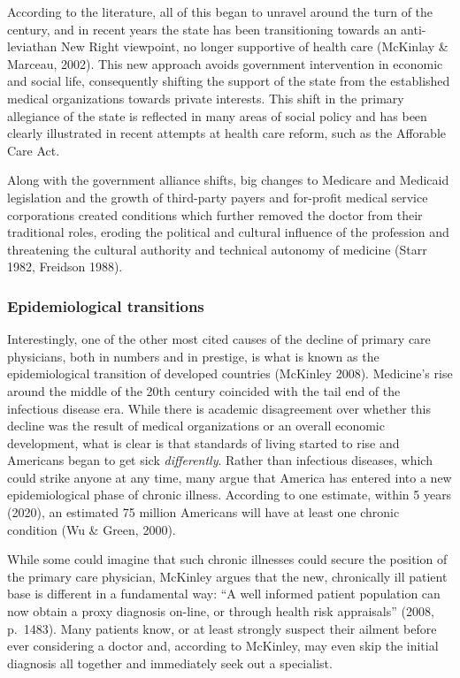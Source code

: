 \documentclass[12pt,twoside]{reedthesis}
\begin{document}
  According to the literature, all of this began to unravel around the
  turn of the century, and in recent years the state has been
  transitioning towards an anti-leviathan New Right viewpoint, no longer
  supportive of health care (McKinlay \& Marceau, 2002). This new approach
  avoids government intervention in economic and social life, consequently
  shifting the support of the state from the established medical
  organizations towards private interests. This shift in the primary
  allegiance of the state is reflected in many areas of social policy and
  has been clearly illustrated in recent attempts at health care reform,
  such as the Afforable Care Act.
  
  Along with the government alliance shifts, big changes to Medicare and
  Medicaid legislation and the growth of third-party payers and for-profit
  medical service corporations created conditions which further removed
  the doctor from their traditional roles, eroding the political and
  cultural influence of the profession and threatening the cultural
  authority and technical autonomy of medicine (Starr 1982, Freidson
  1988).
  
  \subsubsection*{Epidemiological
  transitions}\label{epidemiological-transitions}
  
  Interestingly, one of the other most cited causes of the decline of
  primary care physicians, both in numbers and in prestige, is what is
  known as the epidemiological transition of developed countries (McKinley
  2008). Medicine's rise around the middle of the 20th century coincided
  with the tail end of the infectious disease era. While there is academic
  disagreement over whether this decline was the result of medical
  organizations or an overall economic development, what is clear is that
  standards of living started to rise and Americans began to get sick
  \emph{differently}. Rather than infectious diseases, which could strike
  anyone at any time, many argue that America has entered into a new
  epidemiological phase of chronic illness. According to one estimate,
  within 5 years (2020), an estimated 75 million Americans will have at
  least one chronic condition (Wu \& Green, 2000).
  
  While some could imagine that such chronic illnesses could secure the
  position of the primary care physician, McKinley argues that the new,
  chronically ill patient base is different in a fundamental way: ``A well
  informed patient population can now obtain a proxy diagnosis on-line, or
  through health risk appraisals'' (2008, p.~1483). Many patients know, or
  at least strongly suspect their ailment before ever considering a doctor
  and, according to McKinley, may even skip the initial diagnosis all
  together and immediately seek out a specialist.
  
\end{document}
